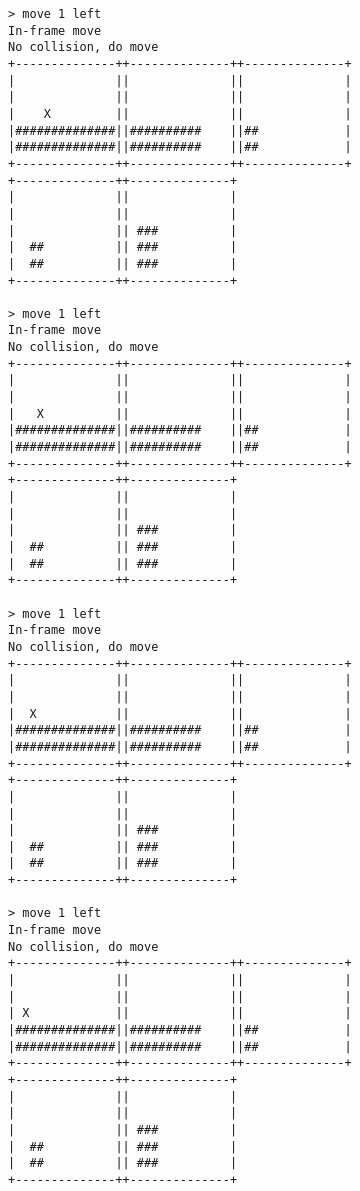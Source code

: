 \begin{verbatim}
> move 1 left
In-frame move
No collision, do move
+--------------++--------------++--------------+
|              ||              ||              |
|              ||              ||              |
|    X         ||              ||              |
|##############||##########    ||##            |
|##############||##########    ||##            |
+--------------++--------------++--------------+
+--------------++--------------+                
|              ||              |                
|              ||              |                
|              || ###          |                
|  ##          || ###          |                
|  ##          || ###          |                
+--------------++--------------+                

> move 1 left
In-frame move
No collision, do move
+--------------++--------------++--------------+
|              ||              ||              |
|              ||              ||              |
|   X          ||              ||              |
|##############||##########    ||##            |
|##############||##########    ||##            |
+--------------++--------------++--------------+
+--------------++--------------+                
|              ||              |                
|              ||              |                
|              || ###          |                
|  ##          || ###          |                
|  ##          || ###          |                
+--------------++--------------+                

> move 1 left
In-frame move
No collision, do move
+--------------++--------------++--------------+
|              ||              ||              |
|              ||              ||              |
|  X           ||              ||              |
|##############||##########    ||##            |
|##############||##########    ||##            |
+--------------++--------------++--------------+
+--------------++--------------+                
|              ||              |                
|              ||              |                
|              || ###          |                
|  ##          || ###          |                
|  ##          || ###          |                
+--------------++--------------+                

> move 1 left
In-frame move
No collision, do move
+--------------++--------------++--------------+
|              ||              ||              |
|              ||              ||              |
| X            ||              ||              |
|##############||##########    ||##            |
|##############||##########    ||##            |
+--------------++--------------++--------------+
+--------------++--------------+                
|              ||              |                
|              ||              |                
|              || ###          |                
|  ##          || ###          |                
|  ##          || ###          |                
+--------------++--------------+                


\end{verbatim}
